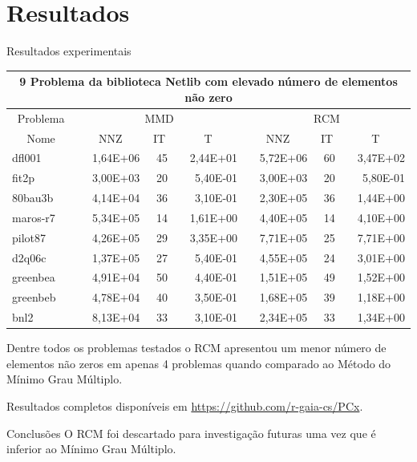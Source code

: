 \documentclass[10pt]{beamer}
\begin{document}
\section{Resultados}
\begin{frame}[fragile]{Resultados experimentais}
  \begin{center}
\begin{tabular}{|l|r|r|r|r|r|r|}
\hline
\multicolumn{7}{|c|}{9 Problema da biblioteca Netlib com elevado número de
elementos não zero} \\ \hline
\multicolumn{1}{|c|}{Problema} & \multicolumn{3}{|c|}{MMD} &         \multicolumn{3}{|c|}{RCM} \\ \hline
\multicolumn{1}{|c|}{Nome} &
        \multicolumn{1}{|c|}{NNZ} & \multicolumn{1}{|c|}{IT} &
        \multicolumn{1}{|c|}{T} &
        \multicolumn{1}{|c|}{NNZ} & \multicolumn{1}{|c|}{IT} &
        \multicolumn{1}{|c|}{T} \\ \hline
dfl001       & 1,64E+06 & 45 & 2,44E+01 & 5,72E+06 & 60 & 3,47E+02 \\ \hline
fit2p        & 3,00E+03 & 20 & 5,40E-01 & 3,00E+03 & 20 & 5,80E-01 \\ \hline
80bau3b      & 4,14E+04 & 36 & 3,10E-01 & 2,30E+05 & 36 & 1,44E+00 \\ \hline
maros-r7     & 5,34E+05 & 14 & 1,61E+00 & 4,40E+05 & 14 & 4,10E+00 \\ \hline
pilot87      & 4,26E+05 & 29 & 3,35E+00 & 7,71E+05 & 25 & 7,71E+00 \\ \hline
d2q06c       & 1,37E+05 & 27 & 5,40E-01 & 4,55E+05 & 24 & 3,01E+00 \\ \hline
greenbea     & 4,91E+04 & 50 & 4,40E-01 & 1,51E+05 & 49 & 1,52E+00 \\ \hline
greenbeb     & 4,78E+04 & 40 & 3,50E-01 & 1,68E+05 & 39 & 1,18E+00 \\ \hline
bnl2         & 8,13E+04 & 33 & 3,10E-01 & 2,34E+05 & 33 & 1,34E+00 \\ \hline
\end{tabular}
  \end{center}

Dentre todos os problemas testados o RCM apresentou um menor número de elementos
não zeros em apenas 4 problemas quando comparado ao Método do Mínimo Grau
Múltiplo.

Resultados completos disponíveis em \url{https://github.com/r-gaia-cs/PCx}.
\end{frame}

\begin{frame}{Conclusões}
  O RCM foi descartado para investigação futuras uma vez que é inferior
  ao Mínimo Grau Múltiplo.
\end{frame}
\end{document}
